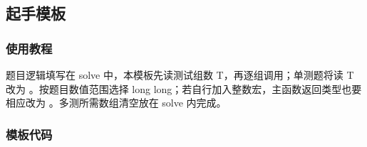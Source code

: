 \subsection{起手模板}
\label{other:solution}
\subsubsection*{使用教程}
题目逻辑填写在 solve 中，本模板先读测试组数 T，再逐组调用；单测题将读 T 改为 。按题目数值范围选择 long long；若自行加入整数宏，主函数返回类型也要相应改为 。多测所需数组清空放在 solve 内完成。
\subsubsection*{模板代码}
